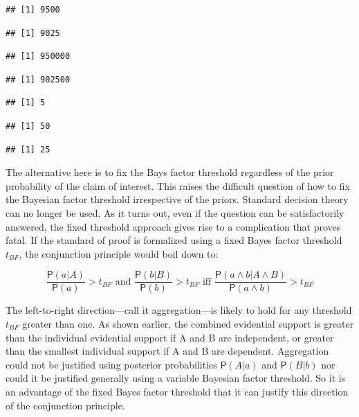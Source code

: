 \documentclass[10pt,dvipsnames,enabledeprecatedfontcommands]{scrartcl}
\newcommand{\et}{\wedge}
\newcommand{\pr}[1]{\mathsf{P}(#1)}
\begin{document}
\begin{verbatim}
## [1] 9500
\end{verbatim}

\begin{verbatim}
## [1] 9025
\end{verbatim}

\begin{verbatim}
## [1] 950000
\end{verbatim}

\begin{verbatim}
## [1] 902500
\end{verbatim}

\begin{verbatim}
## [1] 5
\end{verbatim}

\begin{verbatim}
## [1] 50
\end{verbatim}

\begin{verbatim}
## [1] 25
\end{verbatim}

The alternative here is to fix the Bays factor threshold regardless of
the prior probability of the claim of interest. This raises the
difficult question of how to fix the Bayesian factor threshold
irrespective of the priors. Standard decision theory can no longer be
used. As it turns out, even if the question can be satisfactorily
answered, the fixed threshold approach gives rise to a complication that
proves fatal. If the standard of proof is formalized using a fixed Bayes
factor threshold \(t_{BF}\), the conjunction principle would boil down
to:

\[  \text{ $\frac{\pr{a | A }}{\pr{a}}>t_{BF}$ and $\frac{\pr{ b | B}}{\pr{b}}>t_{BF}$ iff $\frac{\pr{a \et b | A \et B}}{\pr{a \et b}}>t_{BF}$ } \]

\noindent The left-to-right direction---call it aggregation---is likely
to hold for any threshold \(t_{BF}\) greater than one. As shown earlier,
the combined evidential support is greater than the individual
evidential support if A and B are independent, or greater than the
smallest individual support if A and B are dependent. Aggregation could
not be justified using posterior probabilities \(\pr{A | a}\) and
\(\pr{B | b}\) nor could it be justified generally using a variable
Bayesian factor threshold. So it is an advantage of the fixed Bayes
factor threshold that it can justify this direction of the conjunction
principle.
\end{document}
